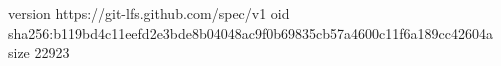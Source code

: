 version https://git-lfs.github.com/spec/v1
oid sha256:b119bd4c11eefd2e3bde8b04048ac9f0b69835cb57a4600c11f6a189cc42604a
size 22923
